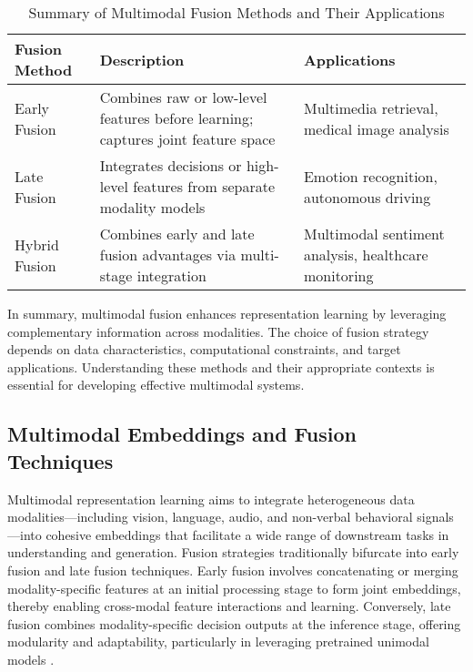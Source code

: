 \documentclass[sigconf]{acmart}
\begin{document}
\begin{table*}[htbp]
\centering
\caption{Summary of Multimodal Fusion Methods and Their Applications}
\label{table:fusion_summary}
\begin{adjustbox}{max width=\textwidth}
\begin{tabular}{@{}lll@{}}
\toprule
\textbf{Fusion Method} & \textbf{Description} & \textbf{Applications} \\ \midrule
Early Fusion & Combines raw or low-level features before learning; captures joint feature space & Multimedia retrieval, medical image analysis \\
Late Fusion & Integrates decisions or high-level features from separate modality models & Emotion recognition, autonomous driving \\
Hybrid Fusion & Combines early and late fusion advantages via multi-stage integration & Multimodal sentiment analysis, healthcare monitoring \\ \bottomrule
\end{tabular}
\end{adjustbox}
\end{table*}

In summary, multimodal fusion enhances representation learning by leveraging complementary information across modalities. The choice of fusion strategy depends on data characteristics, computational constraints, and target applications. Understanding these methods and their appropriate contexts is essential for developing effective multimodal systems.

\subsection{Multimodal Embeddings and Fusion Techniques}

Multimodal representation learning aims to integrate heterogeneous data modalities---including vision, language, audio, and non-verbal behavioral signals---into cohesive embeddings that facilitate a wide range of downstream tasks in understanding and generation. Fusion strategies traditionally bifurcate into early fusion and late fusion techniques. Early fusion involves concatenating or merging modality-specific features at an initial processing stage to form joint embeddings, thereby enabling cross-modal feature interactions and learning. Conversely, late fusion combines modality-specific decision outputs at the inference stage, offering modularity and adaptability, particularly in leveraging pretrained unimodal models \cite{ref1,ref2}. 
\end{document}
